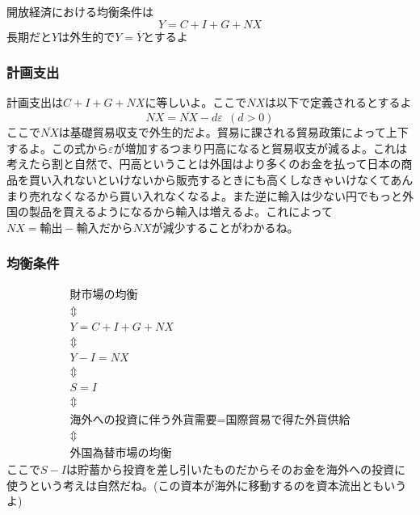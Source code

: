 \documentclass[a4paper, 12pt]{article}
\begin{document}
開放経済における均衡条件は
\begin{equation*}
  Y=C+I+G+NX
\end{equation*}
長期だと$Y$は外生的で$Y=\overline{Y}$とするよ
\subsubsection{計画支出}
計画支出は$C+I+G+NX$に等しいよ。ここで$NX$は以下で定義されるとするよ
\begin{equation*}
  NX=\overline{NX}-d\varepsilon \ \ (d>0)
\end{equation*}
ここで$\overline{NX}$は基礎貿易収支で外生的だよ。貿易に課される貿易政策によって上下するよ。この式から$\varepsilon$が増加するつまり円高になると貿易収支が減るよ。これは考えたら割と自然で、円高ということは外国はより多くのお金を払って日本の商品を買い入れないといけないから販売するときにも高くしなきゃいけなくてあんまり売れなくなるから買い入れなくなるよ。また逆に輸入は少ない円でもっと外国の製品を買えるようになるから輸入は増えるよ。これによって$NX=\text{輸出}-\text{輸入}$だから$NX$が減少することがわかるね。
\subsubsection{均衡条件}
\begin{displaymath}
  \begin{array}{c}
    \text{財市場の均衡}\\
    \Updownarrow \\
    Y=C+I+G+NX \\
    \Updownarrow \\
    Y-I=NX\\
    \Updownarrow \\
    S=I\\
    \Updownarrow \\
      \text{海外への投資に伴う外貨需要} = \text{国際貿易で得た外貨供給}\\
    \Updownarrow \\
    \text{外国為替市場の均衡}
  \end{array}
\end{displaymath}
ここで$S-I$は貯蓄から投資を差し引いたものだからそのお金を海外への投資に使うという考えは自然だね。(この資本が海外に移動するのを資本流出ともいうよ)
\end{document}
